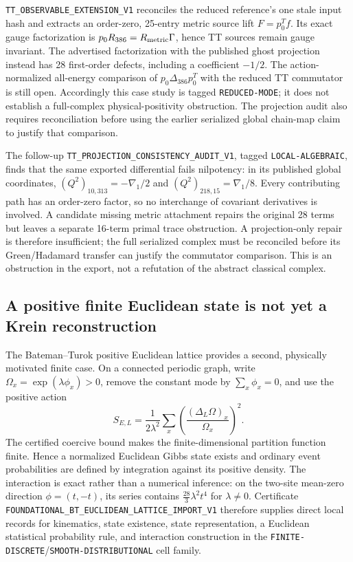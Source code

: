 \documentclass[11pt]{article}
\theoremstyle{definition}
\theoremstyle{remark}
\newcommand{\cert}[1]{\nolinkurl{#1}}
\newcommand{\rtype}[1]{\nolinkurl{#1}}
\begin{document}
\cert{TT_OBSERVABLE_EXTENSION_V1} reconciles the reduced reference's one
stale input hash and extracts an order-zero, 25-entry metric source lift
$F=p_0^T f$. Its exact gauge factorization is
$p_0R_{386}=R_{\rm metric}\Gamma$, hence TT sources remain gauge invariant.
The advertised factorization with the published ghost projection instead
has 28 first-order defects, including a coefficient $-1/2$.
The action-normalized all-energy comparison of
$p_0\Delta_{386}p_0^T$ with the reduced TT commutator is still open.
Accordingly this case study is tagged \rtype{REDUCED-MODE}; it does not
establish a full-complex physical-positivity obstruction. The projection audit
also requires reconciliation before using the earlier serialized global
chain-map claim to justify that comparison.

The follow-up \cert{TT_PROJECTION_CONSISTENCY_AUDIT_V1}, tagged
\rtype{LOCAL-ALGEBRAIC}, finds that the same exported differential fails
nilpotency: in its published global coordinates,
$(Q^2)_{10,313}=-\nabla_1/2$ and $(Q^2)_{218,15}=\nabla_1/8$.
Every contributing path has an order-zero factor, so no interchange of
covariant derivatives is involved. A candidate missing metric attachment
repairs the original 28 terms but leaves a separate 16-term primal trace
obstruction. A projection-only repair is therefore insufficient; the full
serialized complex must be reconciled before its Green/Hadamard transfer
can justify the commutator comparison. This is an obstruction in the export,
not a refutation of the abstract classical complex.

\subsection{A positive finite Euclidean state is not yet a Krein reconstruction}

The Bateman--Turok positive Euclidean lattice provides a second, physically
motivated finite case.  On a connected periodic graph, write
$\Omega_x=\exp(\lambda\phi_x)>0$, remove the constant mode by
$\sum_x\phi_x=0$, and use the positive action
\[
 S_{E,L}=\frac{1}{2\lambda^2}\sum_x
 \left(\frac{(\Delta_L\Omega)_x}{\Omega_x}\right)^2 .
\]
The certified coercive bound makes the finite-dimensional partition function
finite.  Hence a normalized Euclidean Gibbs state exists and ordinary event
probabilities are defined by integration against its positive density.  The
interaction is exact rather than a numerical inference: on the two-site
mean-zero direction $\phi=(t,-t)$, its series contains
$\frac{28}{3}\lambda^2t^4$ for $\lambda\ne0$.  Certificate
\cert{FOUNDATIONAL_BT_EUCLIDEAN_LATTICE_IMPORT_V1} therefore supplies direct
local records for kinematics, state existence, state representation, a
Euclidean statistical probability rule, and interaction construction in the
\rtype{FINITE-DISCRETE}/\rtype{SMOOTH-DISTRIBUTIONAL} cell family.
\end{document}
